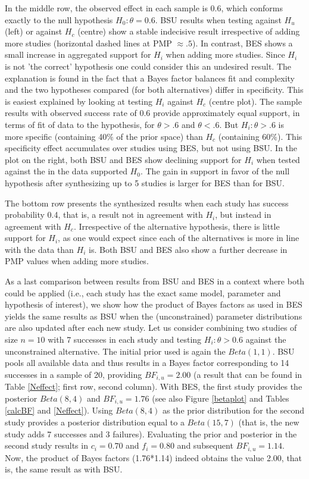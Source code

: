 \documentclass[11pt,reqno]{article}
\begin{document}
In the middle row, the observed effect in each sample is 0.6, which conforms exactly to the null hypothesis $H_0: \theta=0.6$. BSU results when testing against $H_u$ (left) or against $H_c$ (centre) show a stable indecisive result irrespective of adding more studies (horizontal dashed lines at PMP $\approx .5$). In contrast, BES shows a small increase in aggregated support for $H_i$ when adding more studies. Since $H_i$ is not 'the correct' hypothesis one could consider this an undesired result. The explanation is found in the fact that a Bayes factor balances fit and complexity and the two hypotheses compared (for both alternatives) differ in specificity. This is easiest explained by looking at testing $H_i$ against $H_c$ (centre plot). The sample results with observed success rate of 0.6 provide approximately equal support, in terms of fit of data to the hypothesis, for $\theta>.6$ and $\theta<.6$. But $H_i: \theta>.6$ is more specific (containing 40$\%$ of the prior space) than $H_c$ (containing 60$\%$). This specificity effect accumulates over studies using BES, but not using BSU. In the plot on the right, both BSU and BES show declining support for $H_i$ when tested against the in the data supported $H_0$. The gain in support in favor of the null hypothesis after synthesizing up to 5 studies is larger for BES than for BSU.

The bottom row presents the synthesized results when each study has success probability 0.4, that is, a result not in agreement with $H_i$, but instead in agreement with $H_c$. Irrespective of the alternative hypothesis, there is little support for $H_i$, as one would expect since each of the alternatives is more in line with the data than $H_i$ is. Both BSU and BES also show a further decrease in PMP values when adding more studies.

As a last comparison between results from BSU and BES in a context where both could be applied (i.e., each study has the exact same model, parameter and hypothesis of interest), we show how the product of Bayes factors as used in BES yields the same results as BSU when the (unconstrained) parameter distributions are also updated after each new study.
Let us consider combining two studies of size $n=10$ with 7 successes in each study and testing $H_i: \theta>0.6$ against the unconstrained alternative. The initial prior used is again the $Beta(1,1)$. BSU pools all available data and thus results in a Bayes factor corresponding to 14 successes in a sample of 20, providing $BF_{i,u}=2.00$ (a result that can be found in Table \ref{Neffect}; first row, second column).
With BES, the first study provides the posterior $Beta(8,4)$ and $BF_{i,u}=1.76$ (see also Figure \ref{betaplot} and Tables \ref{calcBF} and \ref{Neffect}). Using $Beta(8,4)$ as the prior distribution for the second study provides a posterior distribution equal to a $Beta(15,7)$ (that is, the new study adds 7 successes and 3 failures). Evaluating the prior and posterior in the second study results in $c_i=0.70$ and $f_i=0.80$ and subsequent $BF_{i,u} = 1.14$. Now, the product of Bayes factors (1.76*1.14) indeed obtains the value 2.00, that is, the same result as with BSU.
\end{document}
